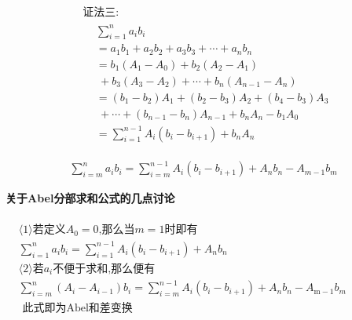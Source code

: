 \documentclass[fontset=windows]{article}
\begin{document}
\begin{figure}[!htb]
\begin{minipage}[t]{0.5\linewidth}
\begin{align}
        & \mbox{证法三:}\nonumber\\
        & \begin{aligned}
            &\sum_{i=1}^n a_i b_i \nonumber\\
            &=a_1 b_1+a_2 b_2+a_3 b_3+\cdots+a_n b_n \nonumber\\
            &=b_1\left(A_1-A_0\right)+b_2\left(A_2-A_1\right)\nonumber\\
            & ~+b_3\left(A_3-A_2\right)+\cdots+b_n\left(A_{n-1}-A_n\right) \nonumber\\
            &=\left(b_1-b_2\right) A_1+\left(b_2-b_3\right) A_2+\left(b_4-b_3\right) A_3\nonumber\\
            & ~+\cdots+\left(b_{n-1}-b_n\right) A_{n-1}+b_n A_n-b_1 A_0 \nonumber\\
            &=\sum_{i=1}^{n-1} A_i\left(b_i-b_{i+1}\right)+b_n A_n\nonumber
        \end{aligned}
    \end{align}
    \end{minipage}
    \end{figure}
    \begin{tcolorbox}[colback=blue!5!white,colframe=blue!75!black,title=Abel分部求和]
        \begin{align}
            \sum_{i=m}^{n}{a_ib_i}=\sum_{i=m}^{n-1} A_{i}\left(b_{i}-b_{i+1}\right)+A_{n} b_{n}-A_{m-1} b_{m}
        \end{align}
    \end{tcolorbox}
    \noindent\textbf{关于Abel分部求和公式的几点讨论}\\
    \mbox{}\\
    \noindent
    $
    \begin{aligned}
        &\langle 1\rangle\mbox{若定义}A_0=0\mbox{,那么当} m=1\mbox{时即有}\nonumber\\
        &\sum_{i=1}^n a_i b_i=\sum_{i=1}^{n-1} A_i\left(b_i-b_{i+1}\right)+A_n b_n\nonumber\\
        &\langle2\rangle\text{若}a_i\text{不便于求和,那么便有}\nonumber\\
        &\sum_{i=m}^n\left(A_i-A_{i-1}\right) b_i=\sum_{i=m}^{n-1} A_i\left(b_i-b_{i+1}\right)+A_n b_n-A_{\mathrm{m}-1} b_m\nonumber\\
        &\text{ 此式即为Abel和差变换}\nonumber\\
    \end{aligned}
    $
\end{document}
